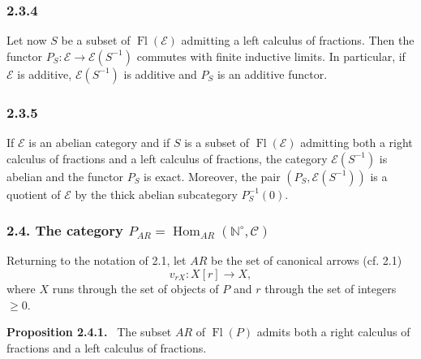 \documentclass[11pt]{article}
\providecommand{\NN}{\mathbb{N}}
\newenvironment{statement}[1]{\par\medskip\noindent\textbf{#1.}\ }{\par\medskip}
\DeclareMathOperator{\Hom}{Hom}
\providecommand{\Hom}{\operatorname{Hom}}
\providecommand{\Fl}{\operatorname{Fl}}
\providecommand{\NN}{\mathbb N}
\providecommand{\cC}{\mathcal C}
\providecommand{\cE}{\mathcal E}
\begin{document}
\subsubsection*{2.3.4}
Let now $S$ be a subset of $\Fl(\cE)$ admitting a left calculus of fractions. Then the functor $P_S:\cE\to\cE(S^{-1})$ commutes with finite inductive limits. In particular, if $\cE$ is additive, $\cE(S^{-1})$ is additive and $P_S$ is an additive functor.

\subsubsection*{2.3.5}
If $\cE$ is an abelian category and if $S$ is a subset of $\Fl(\cE)$ admitting both a right calculus of fractions and a left calculus of fractions, the category $\cE(S^{-1})$ is abelian and the functor $P_S$ is exact. Moreover, the pair $(P_S,\cE(S^{-1}))$ is a quotient of $\cE$ by the thick abelian subcategory $P_S^{-1}(0)$.

\subsubsection*{2.4. The category $P_{AR}=\Hom_{AR}(\NN^\circ,\cC)$}
Returning to the notation of 2.1, let $AR$ be the set of canonical arrows (cf. 2.1)
\[
v_{rX}:X[r]\longrightarrow X,
\]
where $X$ runs through the set of objects of $P$ and $r$ through the set of integers $\ge0$.

\begin{statement}{Proposition 2.4.1}
The subset $AR$ of $\Fl(P)$ admits both a right calculus of fractions and a left calculus of fractions.
\end{statement}
\end{document}
